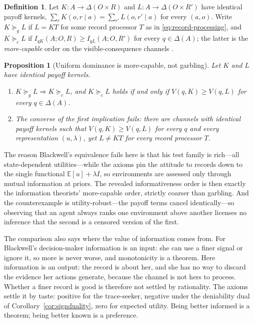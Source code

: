 \documentclass[11pt,a4paper]{article}
\newtheorem{proposition}[theorem]{Proposition}
\theoremstyle{definition}
\newtheorem{definition}[theorem]{Definition}
\newcommand{\D}{\Delta}
\newcommand{\E}{\mathbb E}
\newcommand{\I}{I}
\newcommand{\1}{\mathbf 1}
\begin{document}
\begin{definition}\label{def:channel-orders}
Let $K:A\to\D(O\times R)$ and $L:A\to\D(O\times R')$ have identical payoff kernels,
$\sum_rK(o,r\mid a)=\sum_{r'}L(o,r'\mid a)$ for every $(a,o)$.  Write $K\succeq_gL$ if $L=KT$ for some record
processor $T$ as in \eqref{eq:record-processing}, and $K\succeq_cL$ if
$\I_{qK}(A;O,R)\ge\I_{qL}(A;O,R')$ for every $q\in\D(A)$; the latter is the \emph{more-capable} order on the
visible-consequence channels \cite{KornerMarton1977}.
\end{definition}

\begin{proposition}[Uniform dominance is more-capable, not garbling]\label{prop:blackwell}
Let $K$ and $L$ have identical payoff kernels.
\begin{enumerate}[label=\textup{(\roman*)},leftmargin=*]
\item $K\succeq_gL\Rightarrow K\succeq_cL$, and $K\succeq_cL$ holds if and only if $V(q,K)\ge V(q,L)$ for every
$q\in\D(A)$.
\item The converse of the first implication fails: there are channels with identical payoff kernels such that
$V(q,K)\ge V(q,L)$ for every $q$ and every representation $(u,\lambda)$, yet $L\ne KT$ for every record processor
$T$.
\end{enumerate}
\end{proposition}

The reason Blackwell's equivalence fails here is that his test family is rich---all state-dependent
utilities---while the axioms pin the attitude to records down to the single functional $\E[u]+\lambda\I$, so environments are
assessed only through mutual information at priors.  The revealed informativeness order is then exactly the
information theorists' more-capable order, strictly coarser than garbling.  And the counterexample is
utility-robust---the payoff terms cancel identically---so observing that an agent always ranks one environment
above another licenses no inference that the second is a censored version of the first.

The comparison also says where the value of information comes from.  For Blackwell's decision-maker information
is an input: she can use a finer signal or ignore it, so more is never worse, and monotonicity is a theorem.
Here information is an output: the record is about her, and she has no way to discard the evidence her actions
generate, because the channel is not hers to process.  Whether a finer record is good is therefore not settled
by rationality.  The axioms settle it by taste: positive for the trace-seeker, negative under the deniability
dual of Corollary~\ref{cor:signduality}, zero for expected utility.  Being better informed is a theorem; being
better known is a preference.
\end{document}
